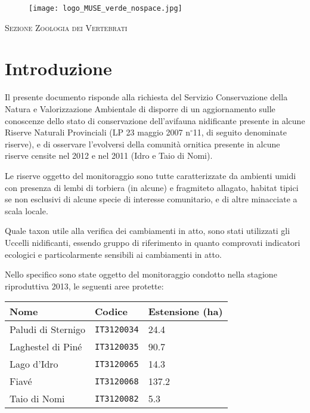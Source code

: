 \documentclass[11pt,a4paper,twoside]{memoir}
\begin{document}
\vspace{\fill}

\begin{figure}[H]
  \centering
    \texttt{[image: logo\_MUSE\_verde\_nospace.jpg]} 
\end{figure} 
\begin{center}
\textsc{Sezione Zoologia dei Vertebrati}
\end{center}


\cleardoublepage
\pagestyle{empty}
\setcounter{tocdepth}{2}
\tableofcontents

\flushleftright

\pagestyle{MUSEstyle}
\chapter{Introduzione}
Il presente documento risponde alla richiesta del Servizio Conservazione della Natura e Valorizzazione Ambientale di disporre di un aggiornamento sulle conoscenze dello stato di conservazione dell'avifauna nidificante presente in alcune Riserve Naturali Provinciali (LP 23 maggio 2007 n$^\circ$11, di seguito denominate riserve), e di osservare l'evolversi della comunità ornitica presente in alcune riserve censite nel 2012 e nel 2011 (Idro e Taio di Nomi). 

Le riserve oggetto del monitoraggio sono tutte caratterizzate da ambienti umidi con presenza di lembi di torbiera (in alcune) e fragmiteto allagato, habitat tipici se non esclusivi di alcune specie di interesse comunitario, e di altre minacciate a scala locale. 

Quale taxon utile alla verifica dei cambiamenti in atto, sono stati utilizzati gli Uccelli nidificanti, essendo gruppo di riferimento in quanto comprovati indicatori ecologici e particolarmente sensibili ai cambiamenti in atto. 

Nello specifico sono state oggetto del monitoraggio condotto nella stagione riproduttiva 2013, le seguenti aree protette:

\begin{table}[H]
\centering
\begin{tabular}{lll}
\textbf{Nome} & \textbf{Codice} & \textbf{Estensione (ha)} \\
\toprule
Paludi di Sternigo & \texttt{IT3120034} &  24.4 \\
Laghestel di Piné & \texttt{IT3120035} & 90.7 \\
Lago d'Idro & \texttt{IT3120065} & 14.3 \\
Fiavé & \texttt{IT3120068} & 137.2 \\
Taio di Nomi & \texttt{IT3120082} & 5.3 \\
\end{tabular}
\end{table}
\end{document}
